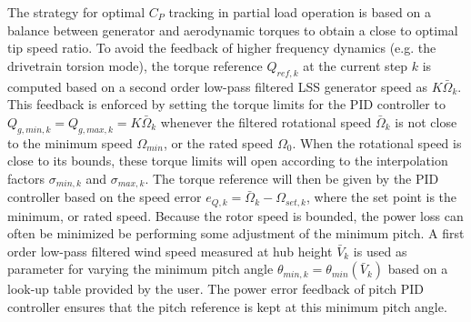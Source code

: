 The strategy for optimal $C_P$ tracking in partial load operation is based on a balance between generator and aerodynamic torques to obtain a close to optimal tip speed ratio. To avoid the feedback of higher frequency dynamics (e.g. the drivetrain torsion mode), the torque reference $Q_{ref,k}$ at the current step $k$ is computed based on a second order low-pass filtered LSS generator speed as $K \bar \Omega_k$. This feedback is enforced by setting the torque limits for the PID controller to $Q_{g,min,k}=Q_{g,max,k}=K\bar \Omega_k$ whenever the filtered rotational speed $\bar \Omega_k$ is not close to the minimum speed $\Omega_{min}$, or the rated speed $\Omega_0$. When the rotational speed is close to its bounds, these torque limits will open according to the interpolation factors $\sigma_{min,k}$ and $\sigma_{max,k}$. The torque reference will then be given by the PID controller based on the speed error $e_{Q,k}=\bar\Omega_k -\Omega_{set,k}$, where the set point is the minimum, or rated speed. Because the rotor speed is bounded, the power loss can often be minimized be performing some adjustment of the minimum pitch. A first order low-pass filtered wind speed measured at hub height $\bar V_k$ is used as parameter for varying the minimum pitch angle $\theta_{min,k}=\theta_{min}(\bar V_k)$ based on a look-up table provided by the user. The power error feedback of pitch PID controller ensures that the pitch reference is kept at this minimum pitch angle.

\begin{sidewaysfigure}
\centerline{ }
\caption{Diagram of the discrete controller. Note that $k$ denotes the current time step. \label{f:diagram}}
\end{sidewaysfigure}

\begin{sidewaysfigure}
\centerline{ }
\caption{Active routes during partial load operation in the controller diagram in Figure~\ref{f:diagram}. \label{f:diagram_part}}
\end{sidewaysfigure}

\begin{sidewaysfigure}
\centerline{ }
\caption{Active routes during full load operation in the controller diagram in Figure~\ref{f:diagram}. \label{f:diagram_full}}
\end{sidewaysfigure}

